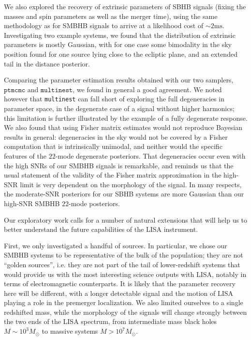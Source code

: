 \documentclass[aps,showpacs,twocolumn,prd,superscriptaddress,nofootinbib]{revtex4-1}
\begin{document}
We also explored the recovery of extrinsic parameters of SBHB signals (fixing the masses and spin parameters as well as the merger time), using the same methodology as for SMBHB signals to arrive at a likelihood cost of $\sim 2 \mathrm{ms}$. Investigating two example systems, we found that the distribution of extrinsic parameters is mostly Gaussian, with for one case some bimodality in the sky position found for one source lying close to the ecliptic plane, and an extended tail in the distance posterior.

Comparing the parameter estimation results obtained with our two samplers, $\texttt{ptmcmc}$ and $\texttt{multinest}$, we found in general a good agreement. We noted however that \texttt{multinest} can fall short of exploring the full degeneracies in parameter space, in the degenerate case of a signal without higher harmonics; this limitation is further illustrated by the example of a fully degenerate response. We also found that using Fisher matrix estimates would not reproduce Bayesian results in general: degeneracies in the sky would not be covered by a Fisher computation that is intrinsically unimodal, and neither would the specific features of the $22$-mode degenerate posteriors. That degeneracies occur even with the high SNRs of our SMBHB signals is remarkable, and reminds us that the usual statement of the validity of the Fisher matrix approximation in the high-SNR limit is very dependent on the morphology of the signal. In many respects, the moderate-SNR posteriors for our SBHB systems are more Gaussian than our high-SNR SMBHB $22$-mode posteriors.

Our exploratory work calls for a number of natural extensions that will help us to better understand the future capabilities of the LISA instrument.

First, we only investigated a handful of sources. In particular, we chose our SMBHB systems to be representative of the bulk of the population; they are not ``golden sources'', i.e. they are not part of the tail of lower-redshift systems that would provide us with the most interesting science outputs with LISA, notably in terms of electromagnetic counterparts. It is likely that the parameter recovery here will be different, with a longer detectable signal and the motion of LISA playing a role in the premerger localization. We also limited ourselves to a single redshifted mass, while the morphology of the signals will change strongly between the two ends of the LISA spectrum, from intermediate mass black holes $M\sim 10^{3} M_{\odot}$ to massive systems $M>10^{7} M_{\odot}$.
\end{document}
